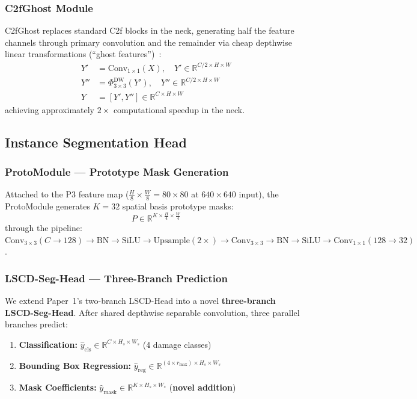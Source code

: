 \documentclass[conference]{IEEEtran}
\begin{document}
\subsubsection{C2fGhost Module}
C2fGhost replaces standard C2f blocks in the neck, generating half the feature channels through primary convolution and the remainder via cheap depthwise linear transformations (``ghost features'')~\cite{han2020ghostnet}:
\begin{align}
Y' &= \text{Conv}_{1\times1}(X), \quad Y' \in \mathbb{R}^{C/2 \times H \times W} \\
Y'' &= \Phi_{3\times3}^{\text{DW}}(Y'), \quad Y'' \in \mathbb{R}^{C/2 \times H \times W} \\
Y &= [Y', Y''] \in \mathbb{R}^{C \times H \times W}
\end{align}
achieving approximately $2\times$ computational speedup in the neck.


\subsection{Instance Segmentation Head}
\label{sec:seghead}

\subsubsection{ProtoModule --- Prototype Mask Generation}
Attached to the P3 feature map ($\frac{H}{8}\times\frac{W}{8} = 80\times80$ at $640\times640$ input), the ProtoModule generates $K=32$ spatial basis prototype masks:
\begin{equation}
P \in \mathbb{R}^{K \times \frac{H}{4} \times \frac{W}{4}}
\end{equation}
through the pipeline: $\text{Conv}_{3\times3}(C{\rightarrow}128) \rightarrow \text{BN} \rightarrow \text{SiLU} \rightarrow \text{Upsample}(2\times) \rightarrow \text{Conv}_{3\times3} \rightarrow \text{BN} \rightarrow \text{SiLU} \rightarrow \text{Conv}_{1\times1}(128{\rightarrow}32)$.

\subsubsection{LSCD-Seg-Head --- Three-Branch Prediction}
We extend Paper~1's two-branch LSCD-Head into a novel \textbf{three-branch LSCD-Seg-Head}. After shared depthwise separable convolution, three parallel branches predict:
\begin{enumerate}[leftmargin=*]
    \item \textbf{Classification:} $\hat{y}_{\text{cls}} \in \mathbb{R}^{C \times H_s \times W_s}$ (4 damage classes)
    \item \textbf{Bounding Box Regression:} $\hat{y}_{\text{reg}} \in \mathbb{R}^{(4 \times r_{\max}) \times H_s \times W_s}$
    \item \textbf{Mask Coefficients:} $\hat{y}_{\text{mask}} \in \mathbb{R}^{K \times H_s \times W_s}$ \quad (\textbf{novel addition})
\end{enumerate}
\end{document}
